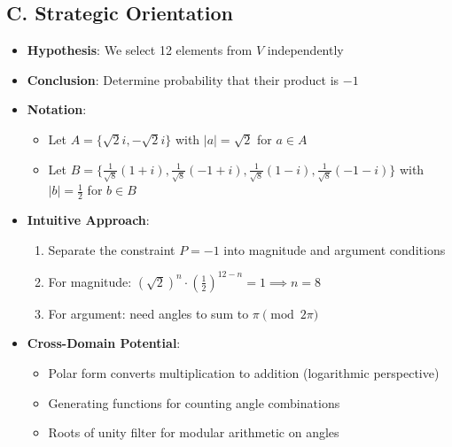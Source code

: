 \documentclass[]{article}
\begin{document}
\begin{problemconfigbox}
\subsection*{C. Strategic Orientation}
\begin{itemize}[leftmargin=*]
    \item \textbf{Hypothesis}: We select 12 elements from $V$ independently
    \item \textbf{Conclusion}: Determine probability that their product is $-1$
    \item \textbf{Notation}: 
    \begin{itemize}
        \item Let $A = \{\sqrt{2}i, -\sqrt{2}i\}$ with $|a| = \sqrt{2}$ for $a \in A$
        \item Let $B = \{\frac{1}{\sqrt{8}}(1+i), \frac{1}{\sqrt{8}}(-1+i), \frac{1}{\sqrt{8}}(1-i), \frac{1}{\sqrt{8}}(-1-i)\}$ with $|b| = \frac{1}{2}$ for $b \in B$
    \end{itemize}
    \item \textbf{Intuitive Approach}: 
    \begin{enumerate}
        \item Separate the constraint $P = -1$ into magnitude and argument conditions
        \item For magnitude: $(\sqrt{2})^n \cdot (\frac{1}{2})^{12-n} = 1 \implies n = 8$
        \item For argument: need angles to sum to $\pi \pmod{2\pi}$
    \end{enumerate}
    \item \textbf{Cross-Domain Potential}: 
    \begin{itemize}
        \item Polar form converts multiplication to addition (logarithmic perspective)
        \item Generating functions for counting angle combinations
        \item Roots of unity filter for modular arithmetic on angles
    \end{itemize}
\end{itemize}
\end{problemconfigbox}
\end{document}
